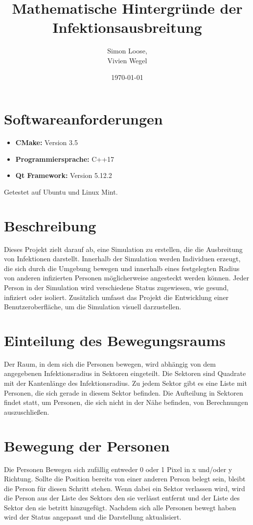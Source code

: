 \documentclass{article}
\title{Mathematische Hintergründe der Infektionsausbreitung}
\author{Simon Loose, \\ Vivien Wegel}
\date{\today}
\begin{document}
	
	\maketitle
	
	\newpage
	
	\tableofcontents
	
	\newpage
	
	\section{Softwareanforderungen}
	\begin{itemize}
		\item \textbf{CMake:} Version 3.5
		\item \textbf{Programmiersprache:} C++17
		\item \textbf{Qt Framework:} Version 5.12.2
	\end{itemize}
	Getestet auf Ubuntu und Linux Mint.
	
	\section{Beschreibung}
	Dieses Projekt zielt darauf ab, eine Simulation zu erstellen, die die Ausbreitung von Infektionen darstellt. Innerhalb der Simulation werden Individuen erzeugt, die sich durch die Umgebung bewegen und innerhalb eines festgelegten Radius von anderen infizierten Personen möglicherweise angesteckt werden können. Jeder Person in der Simulation wird verschiedene Status zugewiesen, wie gesund, infiziert oder isoliert. Zusätzlich umfasst das Projekt die Entwicklung einer Benutzeroberfläche, um die Simulation visuell darzustellen.
	
	\section{Einteilung des Bewegungsraums}
	Der Raum, in dem sich die Personen bewegen, wird abhängig von dem angegebenen Infektionsradius in Sektoren eingeteilt. Die Sektoren sind Quadrate mit der Kantenlänge des Infektionsradius. Zu jedem Sektor gibt es eine Liste mit Personen, die sich gerade in diesem Sektor befinden. Die Aufteilung in Sektoren findet statt, um Personen, die sich nicht in der Nähe befinden, von Berechnungen auszuschließen.
	
	\section{Bewegung der Personen}
	Die Personen Bewegen sich zufällig entweder 0 oder 1 Pixel in x und/oder y Richtung. Sollte die Position bereits von einer anderen Person belegt sein, bleibt die Person für diesen Schritt stehen. Wenn dabei ein Sektor verlassen wird, wird die Person aus der Liste des Sektors den sie verlässt entfernt und der Liste des Sektor den sie betritt hinzugefügt. Nachdem sich alle Personen bewegt haben wird der Status angepasst und die Darstellung aktualisiert.
	
\end{document}
